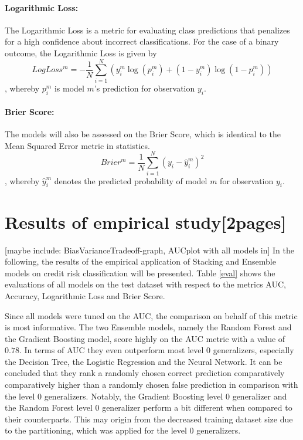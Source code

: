 \documentclass[12pt]{article}
\begin{document}
\paragraph{Logarithmic Loss:} The Logarithmic Loss is a metric for evaluating class predictions that penalizes for a high confidence about incorrect classifications. For the case of a binary outcome, the Logarithmic Loss is given by\\
\begin{equation}
LogLoss^m = - \frac{1}{N}\sum_{i=1}^{N}(y^m_i\log(p^m_i) + (1 - y^m_i)\log(1 - p^m_i))
\end{equation}
, whereby $p^m_i$ is model $m$'s prediction for observation $y_i$.

\paragraph{Brier Score:} The models will also be assessed on the Brier Score, which is identical to the Mean Squared Error metric in statistics.
\begin{equation}
Brier^m = \frac{1}{N}\sum_{i=1}^{N}(y_i - \hat{y}^m_i)^2
\end{equation}
, whereby $\hat{y}^m_i$ denotes the predicted probability of model $m$ for observation $y_i$. 


\section{Results of empirical study[2pages]}\label{results}
[maybe include: BiasVarianceTradeoff-graph, AUCplot with all models in]
In the following, the results of the empirical application of Stacking and Ensemble models on credit risk classification will be presented. Table \ref{eval} shows the evaluations of all models on the test dataset with respect to the metrics AUC, Accuracy, Logarithmic Loss and Brier Score. 

Since all models were tuned on the AUC, the comparison on behalf of this metric is most informative. The two Ensemble models, namely the Random Forest and the Gradient Boosting model, score highly on the AUC metric with a value of $0.78$. In terms of AUC they even outperform most level 0 generalizers, especially the Decision Tree, the Logistic Regression and the Neural Network. It can be concluded that they rank a randomly chosen correct prediction comparatively comparatively higher than a randomly chosen false prediction in comparison with the level 0 generalizers. Notably, the Gradient Boosting level 0 generalizer and the Random Forest level 0 generalizer perform a bit different when compared to their counterparts. This may origin from the decreased training dataset size due to the partitioning, which was applied for the level 0 generalizers. 
\end{document}
